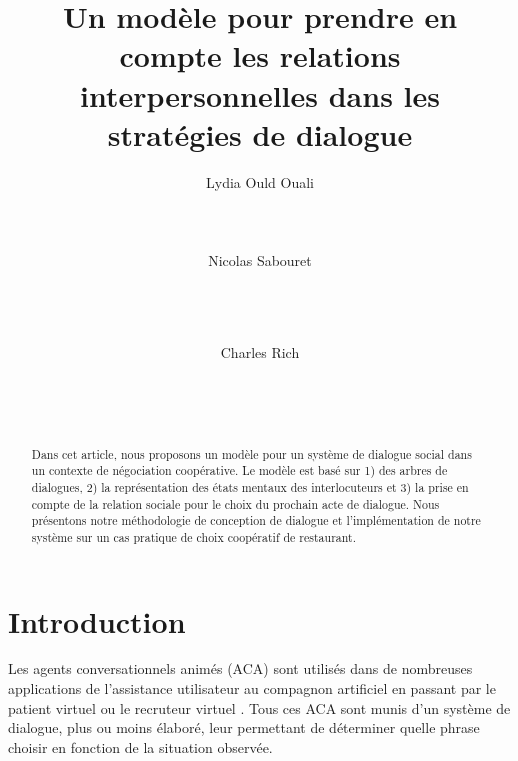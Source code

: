 \documentclass [french]{sig-alternate-05-2015}
\begin{document}
\title{Un modèle pour prendre en compte les relations interpersonnelles dans les stratégies de dialogue}


\author{
\alignauthor Lydia Ould Ouali\\
       \\
       \\
       \\
\alignauthor Nicolas Sabouret\\
       \\
       \\
       \\
        \and
\alignauthor Charles Rich\\
       \\
       \\
       \\
}


\maketitle
\begin{abstract}
\par Dans cet article, nous proposons un modèle pour un système de dialogue social dans un contexte de négociation coopérative. Le modèle est basé sur 1) des arbres de dialogues, 2) la représentation des états mentaux des interlocuteurs et 3) la prise en compte de la relation sociale pour le choix du prochain acte de dialogue. Nous présentons notre méthodologie de conception de dialogue et l'implémentation de notre système sur un cas pratique de choix coopératif de restaurant.
\end{abstract}



\section{Introduction}


Les agents conversationnels animés (ACA) sont utilisés dans de nombreuses applications de l'assistance utilisateur \cite{sidner2013always} au compagnon artificiel \cite{sidner2013always, riviere2014aca} en passant par le patient virtuel \cite{annesysteme} ou le recruteur virtuel \cite{jones2012affective}. Tous ces ACA sont munis d'un système de dialogue, plus ou moins élaboré, leur permettant de déterminer quelle phrase choisir en fonction de la situation observée.
\end{document}
